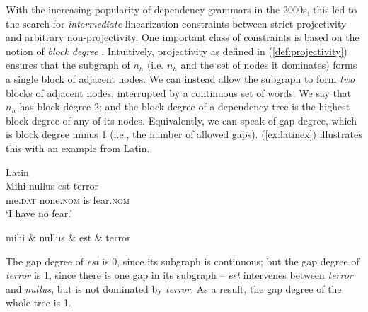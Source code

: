 \documentclass[output=paper,hidelinks]{langscibook}
\begin{document}
With the increasing popularity of dependency grammars in the 2000s,
this led to the search for \emph{intermediate} linearization
constraints between strict projectivity and arbitrary
non-projectivity. One important class of constraints is based on the
notion of \emph{block degree} \citep{HolanEtAl1998}. Intuitively,
projectivity as defined in (\ref{def:projectivity}) ensures that the
subgraph of $n_h$ (i.e. $n_h$ and the set of nodes it dominates) forms
a single block of adjacent nodes. We can instead allow the subgraph to
form \emph{two} blocks of adjacent nodes, interrupted by a continuous
set of words. We say that $n_h$ has block degree 2; and the block
degree of a dependency tree is the highest block degree of any of its
nodes. Equivalently, we can speak of gap degree, which is block degree
minus 1 (i.e., the number of allowed gaps). (\ref{ex:latinex}) illustrates this
with an example from Latin.


\begin{exe}
  \ex\label{ex:latinex}
  \begin{xlist}
    \ex Latin\\
    \gll Mihi nullus est terror\\
    me.\textsc{dat} none.\textsc{nom} is fear.\textsc{nom}\\
    \glt `I have no fear.'
    \ex \label{ex:latintree}
      \begin{dependency}[baseline=-0.6ex,theme=simple]
        \begin{deptext}[column sep=1cm]
          mihi \& nullus \& est \& terror \\
        \end{deptext}
      \end{dependency}
  \end{xlist}
\end{exe}

The gap degree of \textit{est} is 0, since its subgraph is continuous;
but the gap degree of \textit{terror} is 1, since there is one gap in
its subgraph -- \textit{est} intervenes between \textit{terror} and
\textit{nullus}, but is not dominated by \textit{terror}. As a result,
the gap degree of the whole tree is 1.
\end{document}
